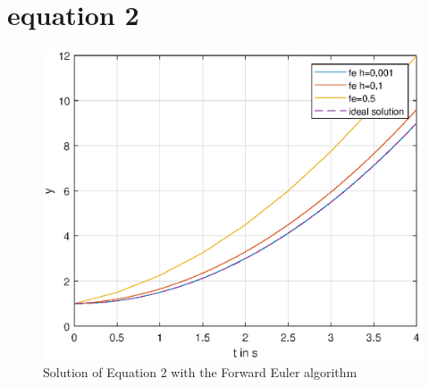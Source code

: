 \section{equation 2}
\begin{figure}[H]
    \centering
    \includegraphics[width=\plotwidth]{plots/fe_only_equation_2.eps}
    \caption{Solution of Equation 2 with the Forward Euler algorithm}
    \label{fig:eq2_fe_only}
\end{figure}


